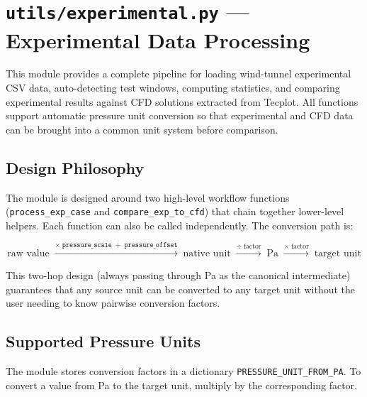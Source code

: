 \documentclass[11pt, letterpaper]{article}
\begin{document}
\newpage
\section{\texttt{utils/experimental.py} --- Experimental Data Processing}
\label{sec:experimental}

This module provides a complete pipeline for loading wind-tunnel
experimental CSV data, auto-detecting test windows, computing statistics,
and comparing experimental results against CFD solutions extracted from
Tecplot. All functions support automatic pressure unit conversion so that
experimental and CFD data can be brought into a common unit system before
comparison.

\subsection{Design Philosophy}

The module is designed around two high-level workflow functions
(\texttt{process\_exp\_case} and \texttt{compare\_exp\_to\_cfd}) that
chain together lower-level helpers. Each function can also be called
independently. The conversion path is:

\begin{equation}
    \text{raw value}
    \;\xrightarrow{\times\;\texttt{pressure\_scale}\;+\;\texttt{pressure\_offset}}\;
    \text{native unit}
    \;\xrightarrow{\div\;\text{factor}}\;
    \text{Pa}
    \;\xrightarrow{\times\;\text{factor}}\;
    \text{target unit}
    \label{eq:conversion}
\end{equation}

This two-hop design (always passing through Pa as the canonical
intermediate) guarantees that any source unit can be converted to any
target unit without the user needing to know pairwise conversion factors.

\subsection{Supported Pressure Units}
\label{subsec:units}

The module stores conversion factors in a dictionary
\texttt{PRESSURE\_UNIT\_FROM\_PA}. To convert a value from Pa to the
target unit, multiply by the corresponding factor.
\end{document}
